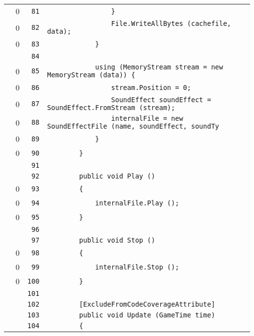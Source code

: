 \documentclass[a4paper,10pt]{article}
\begin{document}
\begin{longtable}[l]{lrrl}
\cellcolor{red} & 0 & \verb~81~ & \verb~                }~\\
\cellcolor{red} & 0 & \verb~82~ & \verb~                File.WriteAllBytes (cachefile, data);~\\
\cellcolor{red} & 0 & \verb~83~ & \verb~            }~\\
\cellcolor{gray} &  & \verb~84~ & \verb~~\\
\cellcolor{red} & 0 & \verb~85~ & \verb~            using (MemoryStream stream = new MemoryStream (data)) {~\\
\cellcolor{red} & 0 & \verb~86~ & \verb~                stream.Position = 0;~\\
\cellcolor{red} & 0 & \verb~87~ & \verb~                SoundEffect soundEffect = SoundEffect.FromStream (stream);~\\
\cellcolor{red} & 0 & \verb~88~ & \verb~                internalFile = new SoundEffectFile (name, soundEffect, soundTy~\\
\cellcolor{red} & 0 & \verb~89~ & \verb~            }~\\
\cellcolor{red} & 0 & \verb~90~ & \verb~        }~\\
\cellcolor{gray} &  & \verb~91~ & \verb~~\\
\cellcolor{gray} &  & \verb~92~ & \verb~        public void Play ()~\\
\cellcolor{red} & 0 & \verb~93~ & \verb~        {~\\
\cellcolor{red} & 0 & \verb~94~ & \verb~            internalFile.Play ();~\\
\cellcolor{red} & 0 & \verb~95~ & \verb~        }~\\
\cellcolor{gray} &  & \verb~96~ & \verb~~\\
\cellcolor{gray} &  & \verb~97~ & \verb~        public void Stop ()~\\
\cellcolor{red} & 0 & \verb~98~ & \verb~        {~\\
\cellcolor{red} & 0 & \verb~99~ & \verb~            internalFile.Stop ();~\\
\cellcolor{red} & 0 & \verb~100~ & \verb~        }~\\
\cellcolor{gray} &  & \verb~101~ & \verb~~\\
\cellcolor{gray} &  & \verb~102~ & \verb~        [ExcludeFromCodeCoverageAttribute]~\\
\cellcolor{gray} &  & \verb~103~ & \verb~        public void Update (GameTime time)~\\
\cellcolor{gray} &  & \verb~104~ & \verb~        {~\\

\end{longtable}
\end{document}
